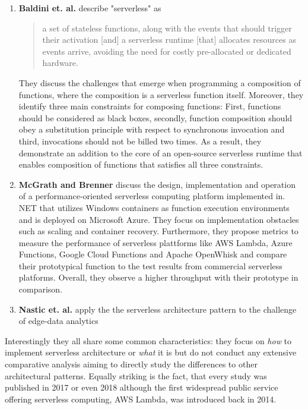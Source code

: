 \begin{enumerate}
    \item 
        \textbf{Baldini et. al.} describe "serverless" as \blockquote{a set of stateless functions, along with the events that should trigger their activation [and] a serverless runtime [that] allocates resources as events arrive, avoiding the need for costly pre-allocated or dedicated hardware.} They discuss the challenges that emerge when programming a composition of functions, where the composition is a serverless function itself. Moreover, they identify three main constraints for composing functions: First, functions should be considered as black boxes, secondly, function composition should obey a substitution principle with respect to synchronous invocation and third,  invocations should not be billed two times. As a result, they demonstrate an addition to the core of an open-source serverless runtime that enables composition of functions that satisfies all three constraints.\autocite{Baldini2017TheComputing}
    \item
        \textbf{McGrath and Brenner} discuss the design, implementation and operation of a performance-oriented serverless computing platform implemented in. NET that utilizes Windows containers as function execution environments and is deployed on Microsoft Azure. They focus on implementation obstacles such as scaling and container recovery. Furthermore, they propose metrics to measure the performance of serverless plattforms like AWS Lambda, Azure Functions, Google Cloud Functions and Apache OpenWhisk and compare their prototypical function to the test results from commercial serverless platforms. Overall, they observe a higher throughput with their prototype in comparison.
    \item
        \textbf{Nastic et. al.} apply the the serverless architecture pattern to the challenge of edge-data analytics 
\end{enumerate}



Interestingly they all share some common characteristics: they focus on \textit{how} to implement serverless architecture or \textit{what} it is but do not conduct any extensive comparative analysis aiming to directly study the differences to other architectural patterns. Equally striking is the fact, that every study was published in 2017 or even 2018 although the first widespread public service offering serverless computing, AWS Lambda, was introduced back in 2014.\autocite{Lindblom2014AWSBlog}\\


